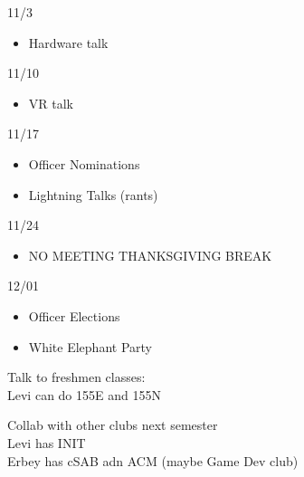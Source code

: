 11/3 \\
\begin{itemize}
    \item Hardware talk
\end{itemize}
11/10 \\
\begin{itemize}
    \item VR talk
\end{itemize}
11/17 \\
\begin{itemize}
    \item Officer Nominations
    \item Lightning Talks (rants)
\end{itemize}
11/24 \\
\begin{itemize}
    \item NO MEETING THANKSGIVING BREAK
\end{itemize}
12/01 \\
\begin{itemize}
    \item Officer Elections
    \item White Elephant Party
\end{itemize}

Talk to freshmen classes: \\
Levi can do 155E and 155N

Collab with other clubs next semester \\
Levi has INIT \\
Erbey has cSAB adn ACM (maybe Game Dev club)
